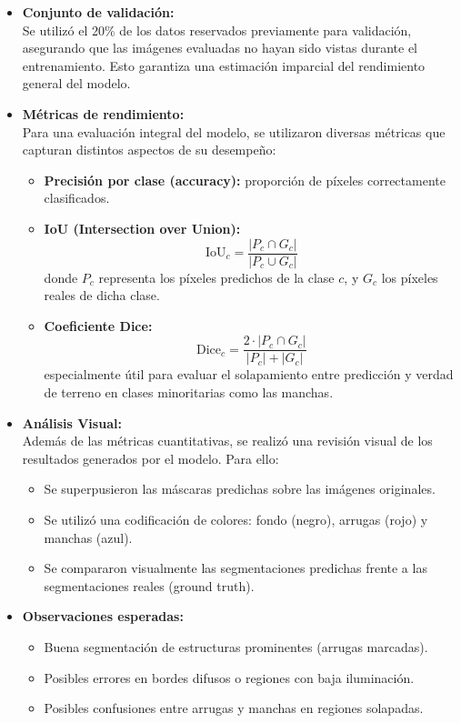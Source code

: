 \begin{itemize}
  \item \textbf{Conjunto de validación:}\\
  Se utilizó el 20\% de los datos reservados previamente para validación, asegurando que las imágenes evaluadas no hayan sido vistas durante el entrenamiento. Esto garantiza una estimación imparcial del rendimiento general del modelo.

  \item \textbf{Métricas de rendimiento:}\\
  Para una evaluación integral del modelo, se utilizaron diversas métricas que capturan distintos aspectos de su desempeño:
  \begin{itemize}
    \item \textbf{Precisión por clase (accuracy):} proporción de píxeles correctamente clasificados.
    \item \textbf{IoU (Intersection over Union):}
    \[
    \text{IoU}_c = \frac{|P_c \cap G_c|}{|P_c \cup G_c|}
    \]
    donde $P_c$ representa los píxeles predichos de la clase $c$, y $G_c$ los píxeles reales de dicha clase.

    \item \textbf{Coeficiente Dice:}
    \[
    \text{Dice}_c = \frac{2 \cdot |P_c \cap G_c|}{|P_c| + |G_c|}
    \]
    especialmente útil para evaluar el solapamiento entre predicción y verdad de terreno en clases minoritarias como las manchas.

  \end{itemize}

  \item \textbf{Análisis Visual:}\\
  Además de las métricas cuantitativas, se realizó una revisión visual de los resultados generados por el modelo. Para ello:
  \begin{itemize}
    \item Se superpusieron las máscaras predichas sobre las imágenes originales.
    \item Se utilizó una codificación de colores: fondo (negro), arrugas (rojo) y manchas (azul).
    \item Se compararon visualmente las segmentaciones predichas frente a las segmentaciones reales (ground truth).
  \end{itemize}

  \item \textbf{Observaciones esperadas:}
  \begin{itemize}
    \item Buena segmentación de estructuras prominentes (arrugas marcadas).
    \item Posibles errores en bordes difusos o regiones con baja iluminación.
    \item Posibles confusiones entre arrugas y manchas en regiones solapadas.
  \end{itemize}


\end{itemize}
